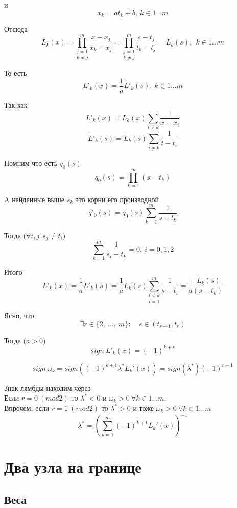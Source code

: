 \documentclass[12pt,a4paper]{article}
\begin{document}
	\noindent и 
	\[
	x_k = a t_{k} + b, \ k \in 1 \ldots m
	\]
	
	\noindent Отсюда
	\[
	L_k(x) = 
	\underset{k \neq j}{\prod_{j=1}^{m}} \frac{x - x_j}{x_k - x_j} = 
	\underset{k \neq j}{\prod_{j=1}^{m}} \frac{s - t_{j}}{t_{k} - t_{j}} =
	\tilde{L}_k(s), \
	\ k \in 1 \ldots m
	\]
	
	\noindent То есть
	\[
	\boxed{
		L'_k(x) = \frac{1}{a} \tilde{L}'_k(s) , 
		\ k \in 1 \ldots m}
	\]
	
	\noindent Так как
	\[
	L'_k(x) = L_k(x)\sum_{i \neq k} \frac{1}{x-x_i}
	\]
	\[
	\tilde{L}'_k(s) = \tilde{L}_k(s)\sum_{i \neq k} \frac{1}{t-t_i}
	\]
	
	\noindent Помним что есть $q_0(s)$ 
	\[
	q_0(s) = \prod_{k=1}^{m} \left( s - t_{k} \right)
	\]
	
	\noindent A найденные выше $s_k$ это корни его производной
	\[
	q'_0(s) = q_0(s)\sum_{k=1}^{m} \frac{1}{s - t_{k}}  
	\]
	
	\noindent Тогда ($ \forall i,j \ \ s_j \neq t_i $)
	\[
	\sum_{k=1}^{m} \frac{1}{s_i - t_{k}}  = 0, \ i=0,1,2
	\]
	
	\noindent Итого
	\[
	L'_k(x) = 
	\frac{1}{a} \tilde{L}'_k(s) =
	\frac{1}{a} \tilde{L}_k(s) \underset{i=1}{\sum_{i \neq k}^m} \frac{1}{s-t_{i}} =
	\frac{-L_k(s)}{a(s-t_{k})}
	\]
	
	\noindent Ясно, что
	\[
	\exists r \in \lbrace 2, \ \ldots, \ m \rbrace : \quad s \in (t_{r-1}, t_r)
	\]
	
	\noindent Тогда ($a>0$)
	\[
	sign \ L'_k(x) = (-1)^{k+r}
	\]
	
	\[
	sign \ \omega_k  = 
	sign \left( (-1)^{k+1} \lambda^* L_k'(x) \right) =
	sign (  \lambda^* )(-1)^{r+1}
	\]
	
	\noindent Знак лямбды находим через\\
	Если $r=0 \ (mod2)$ то $\lambda^*<0$ и $\omega_k > 0 \ \forall k \in 1 \ldots m$.\\
	Впрочем, если $r=1 \ (mod2)$ то $\lambda^*>0$ и тоже $\omega_k > 0 \ \forall k \in 1 \ldots m$
	\[
	\lambda^* = \left( \sum_{k=1}^{m} (-1)^{k+1}  L_k'(x) \right) ^ {-1}
	\]
	
	\newpage
	\section{Два узла на границе}
	
	\subsection{Веса}
	
\end{document}
